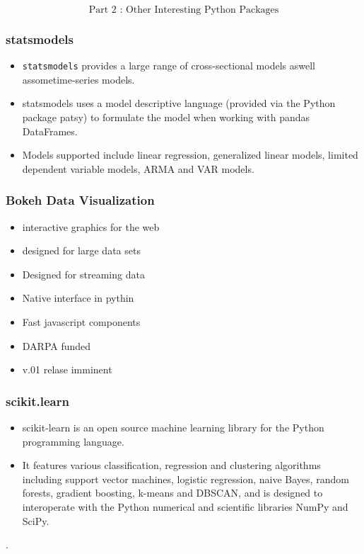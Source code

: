 \documentclass[MASTER.tex]{subfiles}
\begin{document}
 
	
	
\begin{frame}
\[ \mbox{Part 2 : Other Interesting Python Packages} \]
\end{frame}

\begin{frame}
	\frametitle{statsmodels}
	\begin{itemize}
	\item \texttt{statsmodels} provides a large range of cross-sectional models aswell assometime-series models. 
	\item statsmodels
	uses a model descriptive language (provided via the Python package patsy) to formulate the model
	when working with pandas DataFrames.
	\item Models supported include linear regression, generalized linear
	models, limited dependent variable models, ARMA and VAR models.
	\end{itemize}
\end{frame}
\begin{frame}
	\frametitle{Bokeh Data Visualization}
	\begin{itemize}
		\item interactive graphics for the web
		\item designed for large data sets
		\item Designed for streaming data
		\item Native interface in pythin
		\item Fast javascript components
		\item DARPA funded
		\item v.01 relase imminent
	\end{itemize}
	
\end{frame}
\begin{frame}
	\frametitle{scikit.learn}
	\begin{itemize}
	\item scikit-learn is an open source machine learning library for the Python programming language. 
	\item It features various classification, regression and clustering algorithms including support vector machines, logistic regression, naive Bayes, random forests, gradient boosting, k-means and DBSCAN, and is designed to interoperate with the Python numerical and scientific libraries NumPy and SciPy.
	\end{itemize}
	.
\end{frame}
\end{document}
